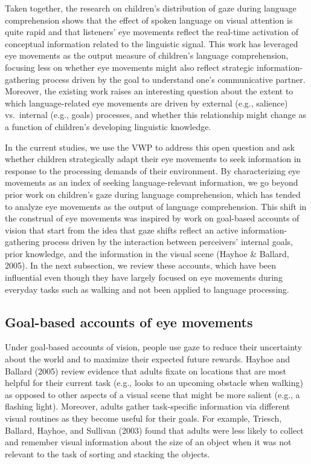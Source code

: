 \documentclass[,man,floatsintext]{apa6}
\begin{document}
Taken together, the research on children's distribution of gaze during language comprehension shows that the effect of spoken language on visual attention is quite rapid and that listeners' eye movements reflect the real-time activation of conceptual information related to the linguistic signal. This work has leveraged eye movements as the output measure of children's language comprehension, focusing less on whether eye movements might also reflect strategic information-gathering process driven by the goal to understand one's communicative partner. Moreover, the existing work raises an interesting question about the extent to which language-related eye movements are driven by external (e.g., salience) vs.~internal (e.g., goals) processes, and whether this relationship might change as a function of children's developing linguistic knowledge.

In the current studies, we use the VWP to address this open question and ask whether children strategically adapt their eye movements to seek information in response to the processing demands of their environment. By characterizing eye movements as an index of seeking language-relevant information, we go beyond prior work on children's gaze during language comprehension, which has tended to analyze eye movements as the output of language comprehension. This shift in the construal of eye movements was inspired by work on goal-based accounts of vision that start from the idea that gaze shifts reflect an active information-gathering process driven by the interaction between perceivers' internal goals, prior knowledge, and the information in the visual scene (Hayhoe \& Ballard, 2005). In the next subsection, we review these accounts, which have been influential even though they have largely focused on eye movements during everyday tasks such as walking and not been applied to language processing.

\hypertarget{goal-based-accounts-of-eye-movements}{%
\subsection{Goal-based accounts of eye movements}\label{goal-based-accounts-of-eye-movements}}

Under goal-based accounts of vision, people use gaze to reduce their uncertainty about the world and to maximize their expected future rewards. Hayhoe and Ballard (2005) review evidence that adults fixate on locations that are most helpful for their current task (e.g., looks to an upcoming obstacle when walking) as opposed to other aspects of a visual scene that might be more salient (e.g., a flashing light). Moreover, adults gather task-specific information via different visual routines as they become useful for their goals. For example, Triesch, Ballard, Hayhoe, and Sullivan (2003) found that adults were less likely to collect and remember visual information about the size of an object when it was not relevant to the task of sorting and stacking the objects.
\end{document}
